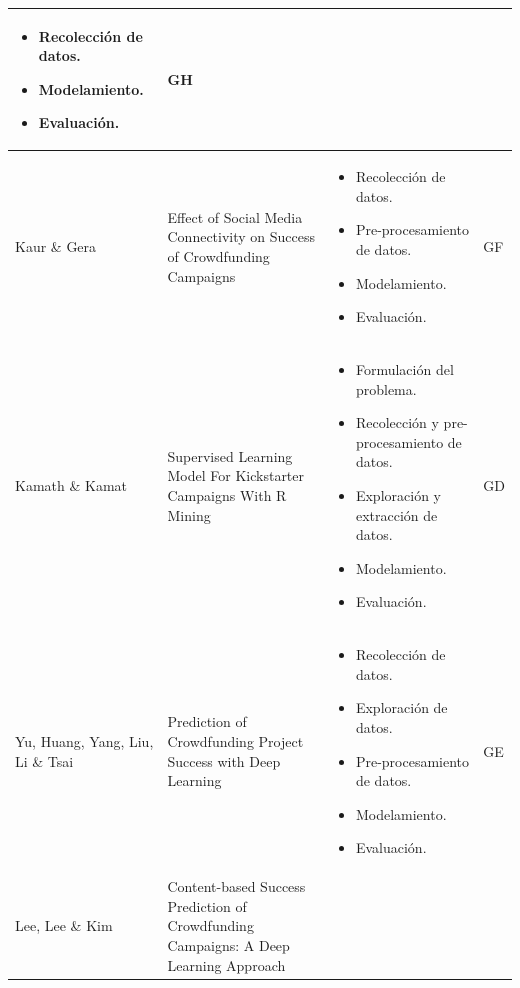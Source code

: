 \begin{longtable}{M{3cm}M{5.5cm}M{5.5cm}M{1.5cm}}
\begin{itemize}[label={--},nosep,noitemsep,leftmargin=*,topsep=0pt,partopsep=0pt]
				\item Recolección de datos.
				\item Modelamiento.
				\item Evaluación.
			\end{itemize}
			& GH
			\\
			\hline
			Kaur \& Gera
			& Effect of Social Media Connectivity on Success of Crowdfunding Campaigns
			& 
			\begin{itemize}[label={--},nosep,noitemsep,leftmargin=*,topsep=0pt,partopsep=0pt]
				\item Recolección de datos.
				\item Pre-procesamiento de datos.
				\item Modelamiento.
				\item Evaluación.
			\end{itemize}
			& GF
			\\
			\hline
			Kamath \& Kamat
			& Supervised Learning Model For Kickstarter Campaigns With R Mining
			& 
			\begin{itemize}[label={--},nosep,noitemsep,leftmargin=*,topsep=0pt,partopsep=0pt]
				\item Formulación del problema.
				\item Recolección y pre-procesamiento de datos.
				\item Exploración y extracción de datos.
				\item Modelamiento.
				\item Evaluación.
			\end{itemize}
			& GD
			\\
			\hline
			Yu, Huang, Yang, Liu, Li \& Tsai
			& Prediction of Crowdfunding Project Success with Deep Learning
			& 
			\begin{itemize}[label={--},nosep,noitemsep,leftmargin=*,topsep=0pt,partopsep=0pt]
				\item Recolección de datos.
				\item Exploración de datos.
				\item Pre-procesamiento de datos.
				\item Modelamiento.
				\item Evaluación.
			\end{itemize}
			& GE
			\\
			\hline
			Lee, Lee \& Kim
			& Content-based Success Prediction of Crowdfunding Campaigns: A Deep Learning Approach
			& 
			\begin{itemize}[label={--},nosep,noitemsep,leftmargin=*,topsep=0pt,partopsep=0pt]

\end{itemize}
\end{longtable}
